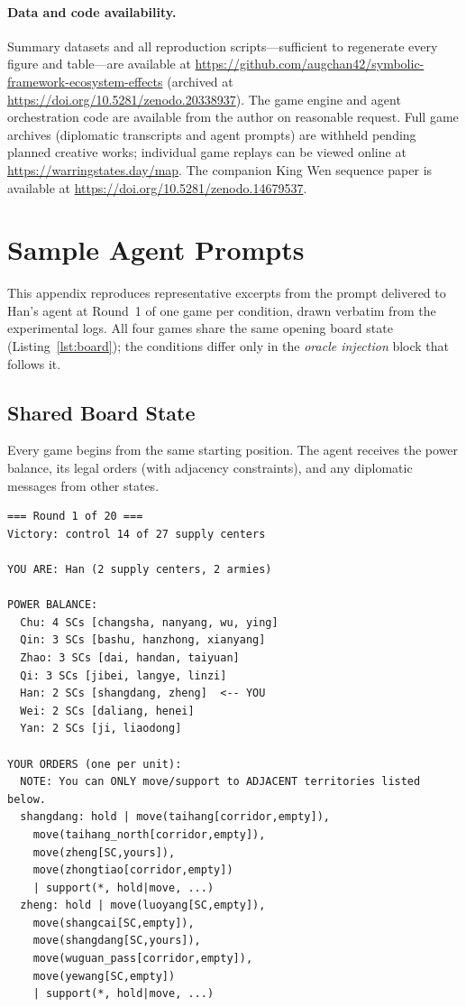 \documentclass[11pt]{article}
\begin{document}
\paragraph{Data and code availability.}
Summary datasets and all reproduction scripts---sufficient to regenerate every figure and table---are available at
\url{https://github.com/augchan42/symbolic-framework-ecosystem-effects}
(archived at \url{https://doi.org/10.5281/zenodo.20338937}).
The game engine and agent orchestration code are available from the author on reasonable request. Full game archives (diplomatic transcripts and agent prompts) are withheld pending planned creative works; individual game replays can be viewed online at \url{https://warringstates.day/map}.
The companion King Wen sequence paper is available at
\url{https://doi.org/10.5281/zenodo.14679537}.




\appendix
\section{Sample Agent Prompts}
\label{app:prompts}

This appendix reproduces representative excerpts from the prompt
delivered to Han's agent at Round~1 of one game per condition,
drawn verbatim from the experimental logs.  All four games share the
same opening board state (Listing~\ref{lst:board}); the conditions
differ only in the \emph{oracle injection} block that follows it.

\subsection{Shared Board State}
\label{app:board}

Every game begins from the same starting position.  The agent
receives the power balance, its legal orders (with adjacency
constraints), and any diplomatic messages from other states.

\begin{lstlisting}[caption={Board state shown to Han at Round~1 (identical across conditions).},label={lst:board}]
=== Round 1 of 20 ===
Victory: control 14 of 27 supply centers

YOU ARE: Han (2 supply centers, 2 armies)

POWER BALANCE:
  Chu: 4 SCs [changsha, nanyang, wu, ying]
  Qin: 3 SCs [bashu, hanzhong, xianyang]
  Zhao: 3 SCs [dai, handan, taiyuan]
  Qi: 3 SCs [jibei, langye, linzi]
  Han: 2 SCs [shangdang, zheng]  <-- YOU
  Wei: 2 SCs [daliang, henei]
  Yan: 2 SCs [ji, liaodong]

YOUR ORDERS (one per unit):
  NOTE: You can ONLY move/support to ADJACENT territories listed below.
  shangdang: hold | move(taihang[corridor,empty]),
    move(taihang_north[corridor,empty]),
    move(zheng[SC,yours]),
    move(zhongtiao[corridor,empty])
    | support(*, hold|move, ...)
  zheng: hold | move(luoyang[SC,empty]),
    move(shangcai[SC,empty]),
    move(shangdang[SC,yours]),
    move(wuguan_pass[corridor,empty]),
    move(yewang[SC,empty])
    | support(*, hold|move, ...)
\end{lstlisting}
\end{document}
